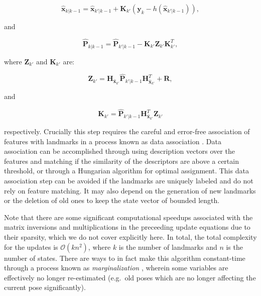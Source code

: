 \begin{equation}
    \hat{\boldsymbol{x}}_{k|k-1}= \hat{\boldsymbol{x}}_{k'|k-1} + \boldsymbol{K}_{k'}(\boldsymbol{y}_{k} - h(\hat{\boldsymbol{x}}_{k'|k-1})),
\end{equation}

\noindent and

\begin{equation}
    \hat{\boldsymbol{P}}_{k|k-1}= \hat{\boldsymbol{P}}_{k'|k-1} - \boldsymbol{K}_{k'} \boldsymbol{Z}_{k'} \boldsymbol{K}_{k'}^T,
\end{equation}

\noindent where $\boldsymbol{Z}_{k'}$ and $\boldsymbol{K}_{k'}$ are:

\begin{equation}
    \boldsymbol{Z}_{k'} = \boldsymbol{H}_{\hat{\boldsymbol{x}}_{k'}} \hat{\boldsymbol{P}}_{k'|k-1} \boldsymbol{H}_{\hat{\boldsymbol{x}}_{k'}}^T + \boldsymbol{R},
\end{equation}

\noindent and

\begin{equation}
    \boldsymbol{K}_{k'} = \hat{\boldsymbol{P}}_{k'|k-1} \boldsymbol{H}_{\hat{\boldsymbol{x}}_{k'}}^T \boldsymbol{Z}_{k'}
\end{equation}

\noindent respectively. Crucially this step requires the careful and error-free association of features with landmarks in a process known as data association . Data association can be accomplished through using description vectors over the features and matching if the similarity of the descriptors are above a certain threshold, or through a Hungarian algorithm for optimal assignment. This data association step can be avoided if the landmarks are uniquely labeled and do not rely on feature matching. It may also depend on the generation of new landmarks or the deletion of old ones to keep the state vector of bounded length.

Note that there are some significant computational speedups associated with the matrix inversions and multiplications in the preceeding update equations due to their sparsity, which we do not cover explicitly here. In total, the total complexity for the updates is $\mathcal{O}(kn^2)$, where $k$ is the number of landmarks and $n$ is the number of states. There are ways to in fact make this algorithm constant-time through a process known as \emph{marginalization} \cite{sibley2010sliding}, wherein some variables are effectively no longer re-estimated (e.g.\ old poses which are no longer affecting the current pose significantly).

